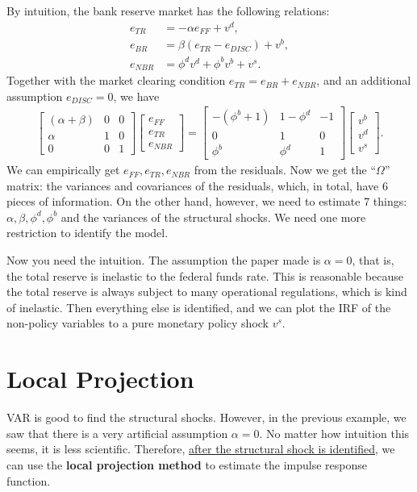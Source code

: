 \documentclass[12pt]{article}
\begin{document}
By intuition, the bank reserve market has the following relations:
\begin{align*}
    e_{TR} &= -\alpha e_{FF} + v^d,\\
    e_{BR} &= \beta (e_{TR} - e_{DISC}) + v^b,\\
    e_{NBR} &= \phi^d v^d + \phi^b v^b + v^s.
\end{align*}
Together with the market clearing condition $e_{TR} = e_{BR} + e_{NBR}$, and an additional assumption $e_{DISC} = 0$, we have
\begin{align*}
    \begin{bmatrix}
        (\alpha + \beta) & 0 & 0\\
        \alpha & 1 & 0\\
        0 & 0 & 1
    \end{bmatrix}
    \begin{bmatrix}
        e_{FF}\\
        e_{TR}\\
        e_{NBR}
    \end{bmatrix}
    =
    \begin{bmatrix}
        -(\phi^b+1) & 1-\phi^d & -1\\
        0 & 1 & 0\\
        \phi^b & \phi^d & 1
    \end{bmatrix}
    \begin{bmatrix}
        v^b\\
        v^d\\
        v^s
    \end{bmatrix}.
\end{align*}
We can empirically get $e_{FF}, e_{TR}, e_{NBR}$ from the residuals. Now we get the ``$\Omega$'' matrix: the variances and covariances of the residuals, which, in total, have 6 pieces of information. On the other hand, however, we need to estimate 7 things: $\alpha, \beta, \phi^d, \phi^b$ and the variances of the structural shocks. We need one more restriction to identify the model.

Now you need the intuition. The assumption the paper made is $\alpha = 0$, that is, the total reserve is inelastic to the federal funds rate. This is reasonable because the total reserve is always subject to many operational regulations, which is kind of inelastic. Then everything else is identified, and we can plot the IRF of the non-policy variables to a pure monetary policy shock $v^s$.

\section{Local Projection}
VAR is good to find the structural shocks. However, in the previous example, we saw that there is a very artificial assumption $\alpha = 0$. No matter how intuition this seems, it is less scientific. Therefore, \underline{after the structural shock is identified}, we can use the \textbf{local projection method} to estimate the impulse response function.
\end{document}
